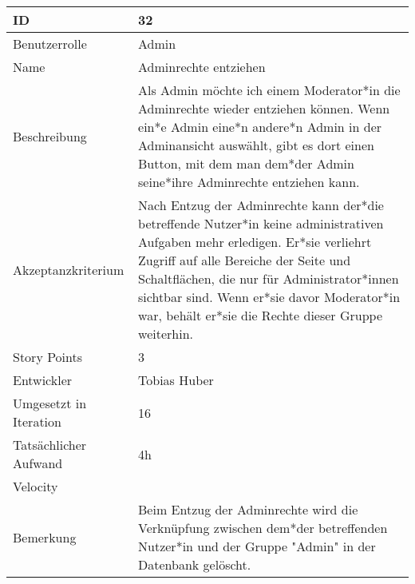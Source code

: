 \begin{tabularx}{\textwidth}{|p{}|X|}
	\hline
	ID & 32 \\
	\hline
	Benutzerrolle & Admin \\
	\hline
	Name & Adminrechte entziehen\\
	\hline
	Beschreibung & Als Admin möchte ich einem Moderator*in die Adminrechte wieder entziehen können. Wenn ein*e Admin eine*n andere*n Admin in der Adminansicht auswählt, gibt es dort einen Button, mit dem man dem*der Admin seine*ihre Adminrechte entziehen kann.  \\
	\hline
	Akzeptanzkriterium & Nach Entzug der Adminrechte kann der*die betreffende Nutzer*in keine administrativen Aufgaben mehr erledigen. Er*sie verliehrt Zugriff auf alle Bereiche der Seite und Schaltflächen, die nur für Administrator*innen sichtbar sind. Wenn er*sie davor Moderator*in war, behält er*sie die Rechte dieser Gruppe weiterhin. \\
	\hline
	Story Points & 3 \\
	\hline
	Entwickler & Tobias Huber \\
	\hline
	Umgesetzt in Iteration & 16\\
	\hline
	Tatsächlicher Aufwand & 4h\\
	\hline
	Velocity & \\
	\hline
	Bemerkung & Beim Entzug der Adminrechte wird die Verknüpfung zwischen dem*der betreffenden Nutzer*in und der Gruppe "Admin" in der Datenbank gelöscht.\\
	\hline
\end{tabularx}
\vspace{20pt}

